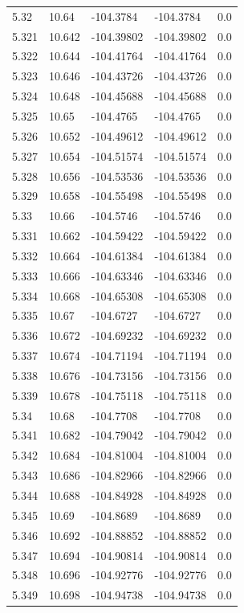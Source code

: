 \begin{tabular}{lllll}
5.32 & 10.64 & -104.3784 & -104.3784 & 0.0 \\
5.321 & 10.642 & -104.39802 & -104.39802 & 0.0 \\
5.322 & 10.644 & -104.41764 & -104.41764 & 0.0 \\
5.323 & 10.646 & -104.43726 & -104.43726 & 0.0 \\
5.324 & 10.648 & -104.45688 & -104.45688 & 0.0 \\
5.325 & 10.65 & -104.4765 & -104.4765 & 0.0 \\
5.326 & 10.652 & -104.49612 & -104.49612 & 0.0 \\
5.327 & 10.654 & -104.51574 & -104.51574 & 0.0 \\
5.328 & 10.656 & -104.53536 & -104.53536 & 0.0 \\
5.329 & 10.658 & -104.55498 & -104.55498 & 0.0 \\
5.33 & 10.66 & -104.5746 & -104.5746 & 0.0 \\
5.331 & 10.662 & -104.59422 & -104.59422 & 0.0 \\
5.332 & 10.664 & -104.61384 & -104.61384 & 0.0 \\
5.333 & 10.666 & -104.63346 & -104.63346 & 0.0 \\
5.334 & 10.668 & -104.65308 & -104.65308 & 0.0 \\
5.335 & 10.67 & -104.6727 & -104.6727 & 0.0 \\
5.336 & 10.672 & -104.69232 & -104.69232 & 0.0 \\
5.337 & 10.674 & -104.71194 & -104.71194 & 0.0 \\
5.338 & 10.676 & -104.73156 & -104.73156 & 0.0 \\
5.339 & 10.678 & -104.75118 & -104.75118 & 0.0 \\
5.34 & 10.68 & -104.7708 & -104.7708 & 0.0 \\
5.341 & 10.682 & -104.79042 & -104.79042 & 0.0 \\
5.342 & 10.684 & -104.81004 & -104.81004 & 0.0 \\
5.343 & 10.686 & -104.82966 & -104.82966 & 0.0 \\
5.344 & 10.688 & -104.84928 & -104.84928 & 0.0 \\
5.345 & 10.69 & -104.8689 & -104.8689 & 0.0 \\
5.346 & 10.692 & -104.88852 & -104.88852 & 0.0 \\
5.347 & 10.694 & -104.90814 & -104.90814 & 0.0 \\
5.348 & 10.696 & -104.92776 & -104.92776 & 0.0 \\
5.349 & 10.698 & -104.94738 & -104.94738 & 0.0 \\

\end{tabular}
